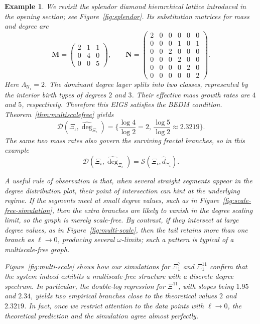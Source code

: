 \documentclass[12pt]{iopart}
\newtheorem{example}[theorem]{Example}
\newcommand*{\dist}{d}
\newcommand*{\ximetric}{(\Xi_\iota,\hat\dist_{\Xi_\iota})}
\begin{document}
\begin{example}
We revisit the splendor diamond hierarchical lattice introduced in the opening section;
see Figure~\ref{fig:splendor}.
Its substitution matrices for mass and degree are
\[
\mathbf M=
\begin{pmatrix}
2 & 1 & 1\\
0 & 4 & 0\\
0 & 0 & 5
\end{pmatrix},
\qquad
\mathbf N=
\begin{pmatrix}
2 & 0 & 0 & 0 & 0 & 0\\
0 & 0 & 0 & 1 & 0 & 1\\
0 & 0 & 2 & 0 & 0 & 0\\
0 & 0 & 0 & 2 & 0 & 0\\
0 & 0 & 0 & 0 & 2 & 0\\
0 & 0 & 0 & 0 & 0 & 2
\end{pmatrix}.
\]
Here $\Lambda_{\mathcal U_\iota}=2$.
The dominant degree layer splits into two classes, represented by the interior birth types of degrees $2$ and $3$.
Their effective mass growth rates are $4$ and $5$, respectively.
Therefore this EIGS satisfies the BEDM condition.
Theorem~\ref{thm:multiscalefree} yields
\[
\mathscr D(\Xi_\iota,\hat{\deg}_{\Xi_\iota})
=
\bigg\{
\frac{\log 4}{\log 2}=2,\,
\frac{\log 5}{\log 2}\approx 2.3219
\bigg\}.
\]
The same two mass rates also govern the surviving fractal branches, so in this example
\[
\mathscr D(\Xi_\iota,\hat{\deg}_{\Xi_\iota})
=
\mathscr S \ximetric.
\]

A useful rule of observation is that, when several straight segments appear in the degree distribution plot,
their point of intersection can hint at the underlying regime.
If the segments meet at small degree values, such as in Figure~\ref{fig:scale-free-simulation},
then the extra branches are likely to vanish in the degree scaling limit, so the graph is merely scale-free.
By contrast, if they intersect at large degree values, as in Figure~\ref{fig:multi-scale},
then the tail retains more than one branch as $\ell\to 0$, producing several $\omega$-limits;
such a pattern is typical of a multiscale-free graph.

Figure~\ref{fig:multi-scale} shows how our simulations for { $\Xi_1^7$ and $\Xi_1^{11}$}
confirm that the system indeed exhibits a multiscale-free structure with a discrete degree spectrum.
In particular, the double-log regression for $\Xi^{11}$, with slopes being $1.95$ and $2.34$, yields two empirical branches close to the theoretical values
$2$ and $2.3219$.
In fact, once we restrict attention to the data points with $\ell\to 0$,
the theoretical prediction and the simulation agree almost perfectly.


\end{example}
\end{document}
